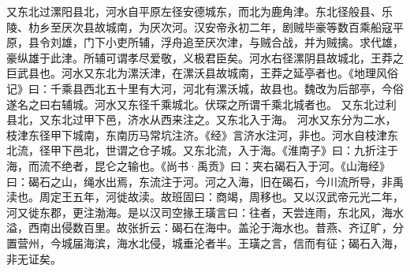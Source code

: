 \documentclass[12pt,UTF8]{ctexbook}
\begin{document}
又东北过漯阳县北，河水自平原左径安德城东，而北为鹿角津。东北径般县、乐陵、朸乡至厌次县故城南，为厌次河。汉安帝永初二年，剧贼毕豪等数百乘船寇平原，县令刘雄，门下小吏所辅，浮舟追至厌次津，与贼合战，并为贼擒。求代雄，豪纵雄于此津。所辅可谓孝尽爱敬，义极君臣矣。河水右径漯阴县故城北，王莽之巨武县也。河水又东北为漯沃津，在漯沃县故城南，王莽之延亭者也。《地理风俗记》曰：千乘县西北五十里有大河，河北有漯沃城，故县也。魏改为后部亭，今俗遂名之曰右辅城。河水又东径千乘城北。伏琛之所谓千乘北城者也。
又东北过利县北，又东北过甲下邑，济水从西来注之。又东北入于海。
河水又东分为二水，枝津东径甲下城南，东南历马常坑注济。《经》言济水注河，非也。河水自枝津东北流，径甲下邑北，世谓之仓子城。又东北流，入于海。《淮南子》曰：九折注于海，而流不绝者，昆仑之输也。《尚书·禹贡》曰：夹右碣石入于河。《山海经》曰：碣石之山，绳水出焉，东流注于河。河之入海，旧在碣石，今川流所导，非禹渎也。周定王五年，河徙故渎。故班固曰：商竭，周移也。又以汉武帝元光二年，河又徙东郡，更注渤海。是以汉司空掾王璜言曰：往者，天尝连雨，东北风，海水溢，西南出侵数百里。故张折云：碣石在海中。盖沦于海水也。昔燕、齐辽旷，分置营州，今城届海滨，海水北侵，城垂沦者半。王璜之言，信而有征；碣石入海，非无证矣。
\end{document}
